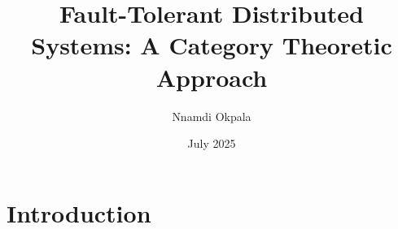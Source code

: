 \documentclass{article}
\title{Fault-Tolerant Distributed Systems: A Category Theoretic Approach}
\author{Nnamdi Okpala}
\date{July 2025}
\begin{document}
\maketitle

\section{Introduction}
\end{document}

